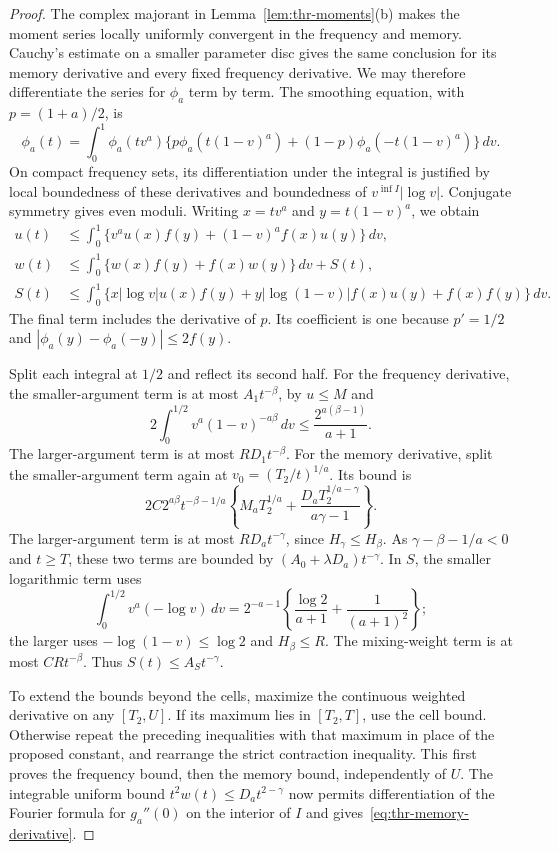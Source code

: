 \begin{proof}
The complex majorant in Lemma~\ref{lem:thr-moments}(b) makes the
moment series locally uniformly convergent in the frequency and memory.
Cauchy's estimate on a smaller parameter disc gives the same conclusion
for its memory derivative and every fixed frequency derivative.
We may therefore differentiate the series for $\phi_a$ term by term.
The smoothing equation, with $p=(1+a)/2$, is
\[
 \phi_a(t)=\int_0^1\phi_a(tv^a)
 \{p\phi_a(t(1-v)^a)+(1-p)\phi_a(-t(1-v)^a)\}\,dv.
\]
On compact frequency sets, its differentiation under the integral is
justified by local boundedness of these derivatives and boundedness of
$v^{\inf I}|\log v|$. Conjugate symmetry gives even moduli.
Writing $x=tv^a$ and $y=t(1-v)^a$, we obtain
\begin{align*}
 u(t)&\le\int_0^1\{v^au(x)f(y)+(1-v)^af(x)u(y)\}\,dv,\\
 w(t)&\le\int_0^1\{w(x)f(y)+f(x)w(y)\}\,dv+S(t),\\
 S(t)&\le\int_0^1\{x|\log v|u(x)f(y)
             +y|\log(1-v)|f(x)u(y)+f(x)f(y)\}\,dv.
\end{align*}
The final term includes the derivative of $p$. Its coefficient is one because $p'=1/2$ and $|\phi_a(y)-\phi_a(-y)|\le2f(y)$.

Split each integral at $1/2$ and reflect its second half. For the
frequency derivative, the smaller-argument term is at most
$A_1t^{-\beta}$, by $u\le M$ and
\[
 2\int_0^{1/2}v^a(1-v)^{-a\beta}\,dv
 \le\frac{2^{a(\beta-1)}}{a+1}.
\]
The larger-argument term is at most $RD_1t^{-\beta}$.
For the memory derivative, split the smaller-argument term again at
$v_0=(T_2/t)^{1/a}$. Its bound is
\[
 2C2^{a\beta}t^{-\beta-1/a}
 \left\{M_aT_2^{1/a}+
 \frac{D_aT_2^{1/a-\gamma}}{a\gamma-1}\right\}.
\]
The larger-argument term is at most $RD_at^{-\gamma}$, since
$H_\gamma\le H_\beta$. As $\gamma-\beta-1/a<0$ and $t\ge T$,
these two terms are bounded by $(A_0+\lambda D_a)t^{-\gamma}$.
In $S$, the smaller logarithmic term uses
\[
 \int_0^{1/2}v^a(-\log v)\,dv
 =2^{-a-1}\left\{\frac{\log2}{a+1}+\frac1{(a+1)^2}\right\};
\]
the larger uses $-\log(1-v)\le\log2$ and $H_\beta\le R$.
The mixing-weight term is at most $CRt^{-\beta}$.
Thus $S(t)\le A_St^{-\gamma}$.

To extend the bounds beyond the cells, maximize the continuous weighted derivative on any $[T_2,U]$.
If its maximum lies in $[T_2,T]$, use the cell bound. Otherwise repeat
the preceding inequalities with that maximum in place of the proposed
constant, and rearrange the strict contraction inequality. This first
proves the frequency bound, then the memory bound, independently of $U$.
The integrable uniform bound $t^2w(t)\le D_at^{2-\gamma}$ now permits
differentiation of the Fourier formula for $g_a''(0)$ on the interior
of $I$ and gives~\eqref{eq:thr-memory-derivative}.
\end{proof}

